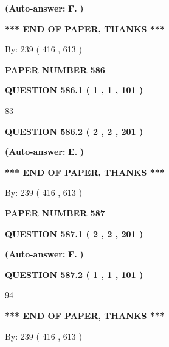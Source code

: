\documentclass[12pt]{article}
\begin{document}
 
{\textbf{(Auto-answer:}}
{\textbf{\large{
F.}}}
{\textbf{)}}
 
 
   
   
   
   
\vspace{1.0in} 
{\textbf{\large{ *** END OF PAPER, THANKS *** }}} 
   
   
\hspace{1.0in} By: 
 239 ( 416 ,  613 )
   
   
   
   
\newpage 
\setcounter{page}{ 
   586001 } 
   
   
 {\textbf{ \Large{ PAPER NUMBER  586  }}}
   
   
   
   
  
  
{\textbf{\large{QUESTION
586.1 
 ( 1 , 1 , 101 )
}}}

83
  
  
{\textbf{\large{QUESTION
586.2 
 ( 2 , 2 , 201 )
}}}
 
 
{\textbf{(Auto-answer:}}
{\textbf{\large{
E.}}}
{\textbf{)}}
 
 
   
   
   
   
\vspace{1.0in} 
{\textbf{\large{ *** END OF PAPER, THANKS *** }}} 
   
   
\hspace{1.0in} By: 
 239 ( 416 ,  613 )
   
   
   
   
\newpage 
\setcounter{page}{ 
   587001 } 
   
   
 {\textbf{ \Large{ PAPER NUMBER  587  }}}
   
   
   
   
  
  
{\textbf{\large{QUESTION
587.1 
 ( 2 , 2 , 201 )
}}}
 
 
{\textbf{(Auto-answer:}}
{\textbf{\large{
F.}}}
{\textbf{)}}
 
 
  
  
{\textbf{\large{QUESTION
587.2 
 ( 1 , 1 , 101 )
}}}

94
   
   
   
   
\vspace{1.0in} 
{\textbf{\large{ *** END OF PAPER, THANKS *** }}} 
   
   
\hspace{1.0in} By: 
 239 ( 416 ,  613 )
   
   
   
\end{document}
